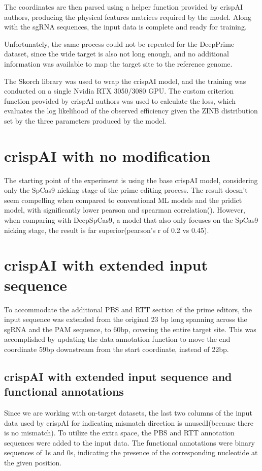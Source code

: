 \documentclass[a4,12pt]{article}
\begin{document}
The coordinates are then parsed using a helper function provided by crispAI authors, producing the physical features matrices required by the model. Along with the sgRNA sequences, the input data is complete and ready for training.

Unfortunately, the same process could not be repeated for the DeepPrime dataset, since the wide target is also not long enough, and no additional information was available to map the target site to the reference genome. 

The Skorch library was used to wrap the crispAI model, and the training was conducted on a single Nvidia RTX 3050/3080 GPU. The custom criterion function provided by crispAI authors was used to calculate the loss, which evaluates the log likelihood of the observed efficiency given the ZINB distribution set by the three parameters produced by the model. 

\section{crispAI with no modification}

The starting point of the experiment is using the base crispAI model, considering only the SpCas9 nicking stage of the prime editing process. The result doesn't seem compelling when compared to conventional ML models and the pridict model, with significantly lower pearson and spearman correlation(). However, when comparing with DeepSpCas9, a model that also only focuses on the SpCas9 nicking stage, the result is far superior(pearson's r of 0.2 vs 0.45).  



\section{crispAI with extended input sequence}

To accommodate the additional PBS and RTT section of the prime editors, the input sequence was extended from the original 23 bp long spanning across the sgRNA and the PAM sequence, to 60bp, covering the entire target site. This was accomplished by updating the data annotation function to move the end coordinate 59bp downstream from the start coordinate, instead of 22bp.

\subsection{crispAI with extended input sequence and functional annotations}

Since we are working with on-target datasets, the last two columns of the input data used by crispAI for indicating mismatch direction is unusedI(because there is no mismatch). To utilize the extra space, the PBS and RTT annotation sequences were added to the input data. The functional annotations were binary sequences of 1s and 0s, indicating the presence of the corresponding nucleotide at the given position.

\printbibliography
\end{document}
